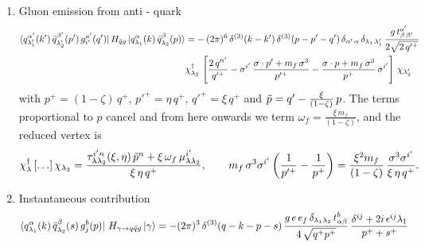 \documentclass[9pt]{article}
\newcommand{\chg}[1]{{\color{red}#1}}
\numberwithin{equation}{section}
\begin{document}
\begin{enumerate}
\begin{align}
\end{align}
\item  Gluon emission from anti - quark
\begin{align}
    \bra{q^{\alpha'}_{\lambda'_{1}}(k')\,\Bar{q}^{\beta'}_{\lambda'_{2}}(p')\,g^{a'}_{i'}(q')}H_{\Bar{q}g}\ket{q^{\alpha}_{\lambda_{1}}(k)\,\Bar{q}^{\beta}_{\lambda_{2}}(p)} & = -\,(2\pi)^{6}\, \delta^{(3)}(k-k')\, \delta^{(3)}(p-p'-q')\,\delta_{\alpha'\,\alpha}\,\delta_{\lambda_{1}\,\lambda'_{1}}\, \frac{g\,t^{a'}_{\beta\,\beta'}}{2\sqrt{2\,q'^{+}}} \notag \\ & \chi^{\dagger}_{\lambda_{2}}\,\left[\frac{2\,q'^{i'}}{q'^{+}}-\sigma^{i'}\,\frac{\sigma\cdot p' +m_{f}\,\sigma^{3}}{p'^{+}}-\frac{\sigma\cdot p +m_{f}\,\sigma^{3}}{p^{+}}\,\sigma^{i'}\right]\,\chi_{\lambda'_{2}}
\end{align}
with $p^{+} = (1-\zeta)\, q^{+},\, p'^{+} = \eta\,q^{+}, \, q'^{+} = \xi\,q^{+}$ and $\Tilde{p} = q' - \frac{\xi}{(1-\zeta)}\, p $. \label{chg:gvert}The terms proportional to $p$ cancel and from here onwards we term $\omega_{f} = \frac{\xi\, m_{f}}{(1-\zeta)}$\chg{, and the reduced vertex is $$\chi^{\dagger}_{\lambda}\left[\ldots\right]\chi_{\lambda_{2}} = \frac{\tau^{i'n}_{\lambda\lambda_{2}}(\xi,\eta)\,\Tilde{p}^{n}+\xi\,\omega_{f}\,\mu^{i'}_{\lambda\lambda_{2}}}{\xi\,\eta\,q^{+}},\hspace{2em} m_{f}\,\sigma^{3}\sigma^{i'}\left(\frac{1}{p'^{+}}-\frac{1}{p^{+}}\right) = \frac{\xi^{2}m_{f}}{(1-\zeta)}\,\frac{\sigma^{3}\sigma^{i'}}{\xi\,\eta\,q^{+}}.$$}
\item  Instantaneous contribution
\begin{align}
    \bra{q^{\alpha}_{\lambda_{1}}(k)\,\Bar{q}^{\beta}_{\lambda_{2}}(s)\,g^{b}_{j}(p)}\,H_{\gamma\rightarrow q\Bar{q}g}\ket{\gamma} & = -(2\pi)^{3}\, \delta^{(3)}(q-k-p-s)\, \frac{g\,e\,e_{f}\,\delta_{\lambda_{1}\lambda_{2}}\,t^{b}_{\alpha\beta}}{4\,\sqrt{q^{+}p^{+}}}\, \frac{\delta^{ij}+2i\,\epsilon^{ij}\lambda_{1}}{p^{+}+s^{+}}
\end{align}
\end{enumerate}
\end{document}
